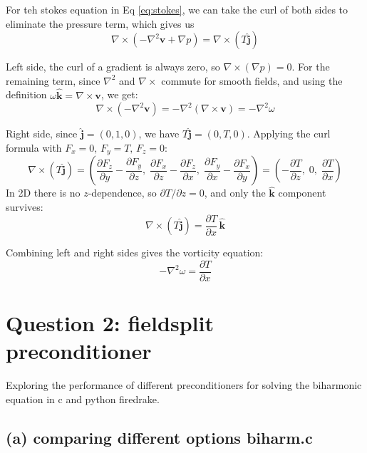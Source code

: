\documentclass[12pt]{article}
\begin{document}
For teh stokes equation in Eq \ref{eq:stokes}, we can take the curl of both sides to eliminate the pressure term, which gives us
\begin{equation}
    \nabla \times (-\nabla^2 \mathbf{v} + \nabla p) = \nabla \times (T \hat{\mathbf{j}})
\end{equation}

Left side, the curl of a gradient is always zero, so $\nabla \times (\nabla p) = 0$. 
For the remaining term, since $\nabla^2$ and $\nabla \times$ commute for smooth fields, and using 
the definition $\omega \hat{\mathbf{k}} = \nabla \times \mathbf{v}$, we get:
\begin{equation}
    \nabla \times (-\nabla^2 \mathbf{v}) = -\nabla^2 (\nabla \times \mathbf{v}) = -\nabla^2 \omega
\end{equation}

Right side, since $\hat{\mathbf{j}} = (0,1,0)$, we have $T\hat{\mathbf{j}} = (0, T, 0)$. 
Applying the curl formula with $F_x = 0,\, F_y = T,\, F_z = 0$:
\begin{equation}
    \nabla \times (T \hat{\mathbf{j}}) = 
    \left(\frac{\partial F_z}{\partial y} - \frac{\partial F_y}{\partial z},\;
          \frac{\partial F_x}{\partial z} - \frac{\partial F_z}{\partial x},\;
          \frac{\partial F_y}{\partial x} - \frac{\partial F_x}{\partial y}\right)
    = \left(-\frac{\partial T}{\partial z},\; 0,\; \frac{\partial T}{\partial x}\right)
\end{equation}
In 2D there is no $z$-dependence, so $\partial T/\partial z = 0$, and only the $\hat{\mathbf{k}}$ 
component survives:
\begin{equation}
    \nabla \times (T \hat{\mathbf{j}}) = \frac{\partial T}{\partial x}\,\hat{\mathbf{k}}
\end{equation}

Combining left and right sides gives the vorticity equation:
\begin{equation}
    \boxed{-\nabla^2 \omega = \frac{\partial T}{\partial x}}
\end{equation}

\section{Question 2: fieldsplit preconditioner}
Exploring the performance of different preconditioners for solving the biharmonic equation in c and python firedrake.
\subsection{(a) comparing different options biharm.c}
\end{document}
